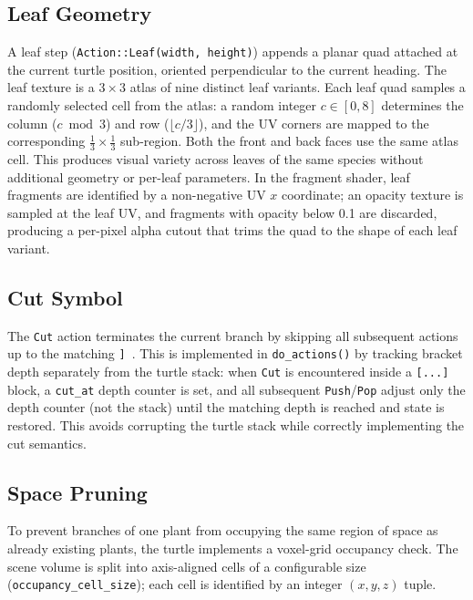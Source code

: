 \subsection{Leaf Geometry}

A leaf step (\texttt{Action::Leaf(width, height)}) appends a planar quad attached at the current turtle
position, oriented perpendicular to the current heading. The leaf texture is a $3 \times 3$ atlas of nine
distinct leaf variants. Each leaf quad samples a randomly selected cell from the atlas: a random integer $c
\in [0, 8]$ determines the column ($c \bmod 3$) and row ($\lfloor c / 3 \rfloor$), and the UV corners are
mapped to the corresponding $\frac{1}{3} \times \frac{1}{3}$ sub-region. Both the front and back faces use
the same atlas cell. This produces visual variety across leaves of the same species without additional
geometry or per-leaf parameters. In the fragment shader, leaf fragments are identified by a non-negative UV
$x$ coordinate; an opacity texture is sampled at the leaf UV, and fragments with opacity below 0.1 are
discarded, producing a per-pixel alpha cutout that trims the quad to the shape of each leaf variant.

\subsection{Cut Symbol}

The \texttt{Cut} action terminates the current branch by skipping all subsequent actions up to the matching
\texttt{]}~\cite{prusinkiewiczAlgorithmicBeautyPlants1990}. This is implemented in \texttt{do\_actions()} by
tracking bracket depth separately from the turtle stack: when \texttt{Cut} is encountered inside a
\texttt{[...]} block, a \texttt{cut\_at} depth counter is set, and all subsequent \texttt{Push}/\texttt{Pop}
adjust only the depth counter (not the stack) until the matching depth is reached and state is restored. This
avoids corrupting the turtle stack while correctly implementing the cut semantics.

\subsection{Space Pruning}

To prevent branches of one plant from occupying the same region of space as already existing plants, the
turtle implements a voxel-grid occupancy check. The scene volume is split into axis-aligned cells of a
configurable size (\texttt{occupancy\_cell\_size}); each cell is identified by an integer $(x, y, z)$ tuple.

